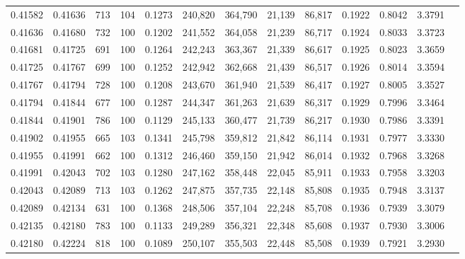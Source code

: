 \begin{tabular}{rrrrrrrrrrrrr}
0.41582 & 0.41636 &   713 & 104 &                                     0.1273 & 240,820 & 364,790 &  21,139 &  86,817 & 0.1922 & 0.8042 & 3.3791 \\
0.41636 & 0.41680 &   732 & 100 &                                     0.1202 & 241,552 & 364,058 &  21,239 &  86,717 & 0.1924 & 0.8033 & 3.3723 \\
0.41681 & 0.41725 &   691 & 100 &                                     0.1264 & 242,243 & 363,367 &  21,339 &  86,617 & 0.1925 & 0.8023 & 3.3659 \\
0.41725 & 0.41767 &   699 & 100 &                                     0.1252 & 242,942 & 362,668 &  21,439 &  86,517 & 0.1926 & 0.8014 & 3.3594 \\
0.41767 & 0.41794 &   728 & 100 &                                     0.1208 & 243,670 & 361,940 &  21,539 &  86,417 & 0.1927 & 0.8005 & 3.3527 \\
0.41794 & 0.41844 &   677 & 100 &                                     0.1287 & 244,347 & 361,263 &  21,639 &  86,317 & 0.1929 & 0.7996 & 3.3464 \\
0.41844 & 0.41901 &   786 & 100 &                                     0.1129 & 245,133 & 360,477 &  21,739 &  86,217 & 0.1930 & 0.7986 & 3.3391 \\
0.41902 & 0.41955 &   665 & 103 &                                     0.1341 & 245,798 & 359,812 &  21,842 &  86,114 & 0.1931 & 0.7977 & 3.3330 \\
0.41955 & 0.41991 &   662 & 100 &                                     0.1312 & 246,460 & 359,150 &  21,942 &  86,014 & 0.1932 & 0.7968 & 3.3268 \\
0.41991 & 0.42043 &   702 & 103 &                                     0.1280 & 247,162 & 358,448 &  22,045 &  85,911 & 0.1933 & 0.7958 & 3.3203 \\
0.42043 & 0.42089 &   713 & 103 &                                     0.1262 & 247,875 & 357,735 &  22,148 &  85,808 & 0.1935 & 0.7948 & 3.3137 \\
0.42089 & 0.42134 &   631 & 100 &                                     0.1368 & 248,506 & 357,104 &  22,248 &  85,708 & 0.1936 & 0.7939 & 3.3079 \\
0.42135 & 0.42180 &   783 & 100 &                                     0.1133 & 249,289 & 356,321 &  22,348 &  85,608 & 0.1937 & 0.7930 & 3.3006 \\
0.42180 & 0.42224 &   818 & 100 &                                     0.1089 & 250,107 & 355,503 &  22,448 &  85,508 & 0.1939 & 0.7921 & 3.2930 \\

\end{tabular}
